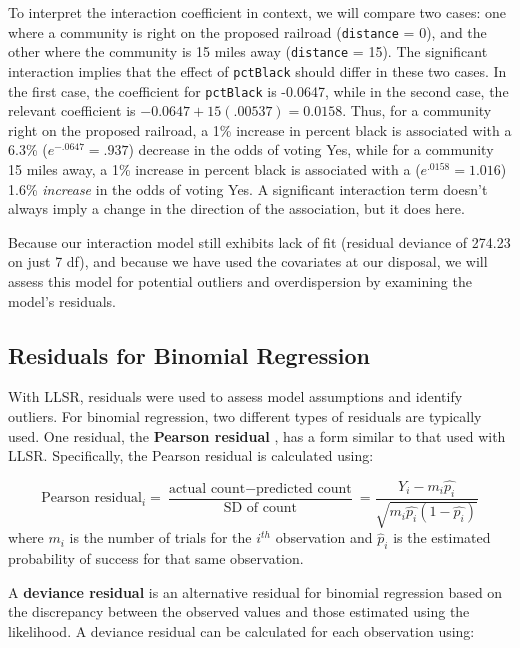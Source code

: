 \documentclass[
]{krantz}
\begin{document}
To interpret the interaction coefficient in context, we will compare two cases: one where a community is right on the proposed railroad (\texttt{distance} = 0), and the other where the community is 15 miles away (\texttt{distance} = 15). The significant interaction implies that the effect of \texttt{pctBlack} should differ in these two cases. In the first case, the coefficient for \texttt{pctBlack} is -0.0647, while in the second case, the relevant coefficient is \(-0.0647+15(.00537) = 0.0158\). Thus, for a community right on the proposed railroad, a 1\% increase in percent black is associated with a 6.3\% (\(e^{-.0647}=.937\)) decrease in the odds of voting Yes, while for a community 15 miles away, a 1\% increase in percent black is associated with a (\(e^{.0158}=1.016\)) 1.6\% \emph{increase} in the odds of voting Yes. A significant interaction term doesn't always imply a change in the direction of the association, but it does here.

Because our interaction model still exhibits lack of fit (residual deviance of 274.23 on just 7 df), and because we have used the covariates at our disposal, we will assess this model for potential outliers and overdispersion by examining the model's residuals.

\hypertarget{residuals-for-binomial-regression}{%
\subsection{Residuals for Binomial Regression}\label{residuals-for-binomial-regression}}

With LLSR, residuals were used to assess model assumptions and identify outliers. For binomial regression, two different types of residuals are typically used. One residual, the \textbf{Pearson residual} , has a form similar to that used with LLSR. Specifically, the Pearson residual is calculated using:

\begin{equation*}
\textrm{Pearson residual}_i = \frac{\textrm{actual count}-\textrm{predicted count}}{\textrm{SD of count}} =
\frac{Y_i-m_i\hat{p_i}}{\sqrt{m_i\hat{p_i}(1-\hat{p_i})}}
\end{equation*}
where \(m_i\) is the number of trials for the \(i^{th}\) observation and \(\hat{p}_i\) is the estimated probability of success for that same observation.

A \textbf{deviance residual}  is an alternative residual for binomial regression based on the discrepancy between the observed values and those estimated using the likelihood.
A deviance residual can be calculated for each observation using:
\end{document}
